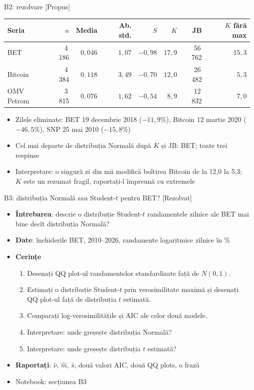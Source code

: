 \ifsolutions
\begin{frame}{B2: rezolvare [Propus]}
\itemsize{\footnotesize}
\begin{center}
\footnotesize
\begin{tabular}{lrrrrrrr}
\toprule
Seria & $n$ & Media & Ab. std. & $S$ & $K$ & JB & $K$ fără max \\
\midrule
BET & 4\,186 & $0{,}046$ & $1{,}07$ & $-0{,}98$ & $17{,}9$ & 56\,762 & $15{,}3$ \\
Bitcoin & 4\,384 & $0{,}118$ & $3{,}49$ & $-0{,}70$ & $12{,}0$ & 26\,482 & $5{,}3$ \\
OMV Petrom & 3\,815 & $0{,}076$ & $1{,}62$ & $-0{,}54$ & $8{,}9$ & 12\,832 & $7{,}0$ \\
\bottomrule
\end{tabular}
\end{center}
\begin{itemize}
    \item Zilele eliminate: BET 19 decembrie 2018 ($-11{,}9\%$), Bitcoin 12 martie 2020 ($-46{,}5\%$), SNP 25 mai 2010 ($-15{,}8\%$)
    \item Cel mai departe de distribuția Normală după $K$ și JB: BET; toate trei respinse
    \item Interpretare: o singură zi din mii modifică boltirea Bitcoin de la 12{,}0 la 5{,}3; $K$ este un rezumat fragil, raportați-l împreună cu extremele
\end{itemize}
\end{frame}
\fi

\begin{frame}{B3: distribuția Normală sau Student-$t$ pentru BET? [Rezolvat]}
\itemsize{\footnotesize}
\begin{itemize}
\item \textbf{Întrebarea}: descrie o distribuție Student-$t$ randamentele zilnice ale BET mai bine decît distribuția Normală?
\item \textbf{Date}: închiderile BET, 2010--2026, randamente logaritmice zilnice în \%
\item \textbf{Cerințe}
\begin{enumerate}
    \item Desenați QQ plot-ul randamentelor standardizate față de $N(0,1)$.
    \item Estimați o distribuție Student-$t$ prin verosimilitate maximă și desenați QQ plot-ul față de distribuția $t$ estimată.
    \item Comparați log-verosimilitățile și AIC ale celor două modele.
    \item Interpretare: unde greșește distribuția Normală?
    \item Interpretare: unde greșește distribuția $t$ estimată?
\end{enumerate}
\item \textbf{Raportați}: $\hat\nu$, $\hat m$, $\hat s$, două valori AIC, două QQ plots, o frază
\item Notebook: secțiunea B3
\end{itemize}
\end{frame}

